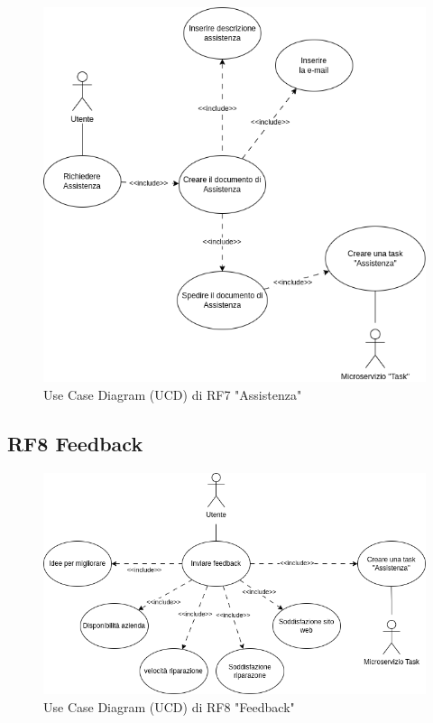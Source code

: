 \documentclass{report}
\begin{document}
\begin{figure}[H]
	\centering\includegraphics[width=1\textwidth]{images/UCD/RF7_assistenza_UCD.png}
	Use Case Diagram (UCD) di RF7 "Assistenza"
\end{figure}


\subsection*{RF8 Feedback}

\begin{figure}[H]
	\centering\includegraphics[width=1\textwidth]{images/UCD/RF8_feedback_UCD.png}
	Use Case Diagram (UCD) di RF8 "Feedback"
\end{figure}
\end{document}
